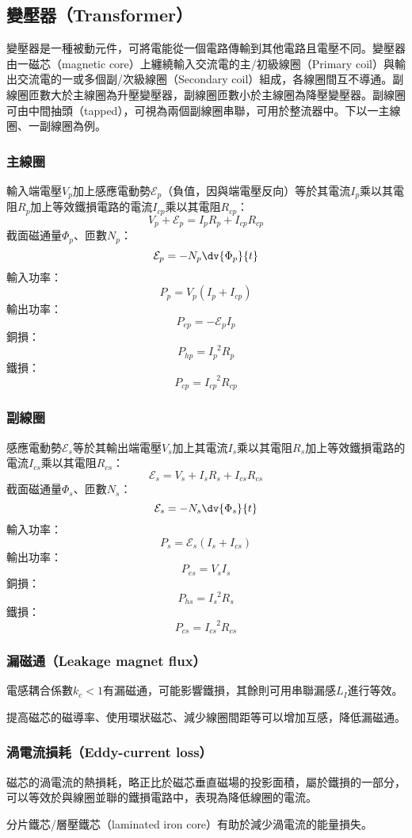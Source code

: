 \documentclass[a4paper,12pt]{report}
\begin{document}
\begin{itemize}
\subsection{變壓器（Transformer）}
變壓器是一種被動元件，可將電能從一個電路傳輸到其他電路且電壓不同。變壓器由一磁芯（magnetic core）上纏繞輸入交流電的主/初級線圈（Primary coil）與輸出交流電的一或多個副/次級線圈（Secondary coil）組成，各線圈間互不導通。副線圈匝數大於主線圈為升壓變壓器，副線圈匝數小於主線圈為降壓變壓器。副線圈可由中間抽頭（tapped），可視為兩個副線圈串聯，可用於整流器中。下以一主線圈、一副線圈為例。
\subsubsection{主線圈}
輸入端電壓$V_p$加上感應電動勢$\mathcal{E}_p$（負值，因與端電壓反向）等於其電流$I_p$乘以其電阻$R_p$加上等效鐵損電路的電流$I_{cp}$乘以其電阻$R_{cp}$：
\[V_p+\mathcal{E}_p=I_pR_p+I_{cp}R_{cp}\]
截面磁通量$\Phi_p$、匝數$N_p$：
\[\mathcal{E}_p=-N_p\dv{\Phi_p}{t}\]
輸入功率：
\[P_p=V_p(I_p+I_{cp})\]
輸出功率：
\[P_{ep}=-\mathcal{E}_pI_p\]
銅損：
\[P_{hp}=I_p^{\phantom{p}2}R_p\]
鐵損：
\[P_{cp}=I_{cp}^{\phantom{cp}2}R_{cp}\]
\subsubsection{副線圈}
感應電動勢$\mathcal{E}_s$等於其輸出端電壓$V_s$加上其電流$I_s$乘以其電阻$R_s$加上等效鐵損電路的電流$I_{cs}$乘以其電阻$R_{cs}$：
\[\mathcal{E}_s=V_s+I_sR_s+I_{cs}R_{cs}\]
截面磁通量$\Phi_s$、匝數$N_s$：
\[\mathcal{E}_s=-N_s\dv{\Phi_s}{t}\]
輸入功率：
\[P_s=\mathcal{E}_s(I_s+I_{cs})\]
輸出功率：
\[P_{es}=V_sI_s\]
銅損：
\[P_{hs}=I_s^{\phantom{s}2}R_s\]
鐵損：
\[P_{cs}=I_{cs}^{\phantom{cs}2}R_{cs}\]
\subsubsection{漏磁通（Leakage magnet flux）}
電感耦合係數$k_c<1$有漏磁通，可能影響鐵損，其餘則可用串聯漏感$L_I$進行等效。

提高磁芯的磁導率、使用環狀磁芯、減少線圈間距等可以增加互感，降低漏磁通。
\subsubsection{渦電流損耗（Eddy-current loss）}
磁芯的渦電流的熱損耗，略正比於磁芯垂直磁場的投影面積，屬於鐵損的一部分，可以等效於與線圈並聯的鐵損電路中，表現為降低線圈的電流。

分片鐵芯/層壓鐵芯（laminated iron core）有助於減少渦電流的能量損失。

\end{itemize}
\end{document}
